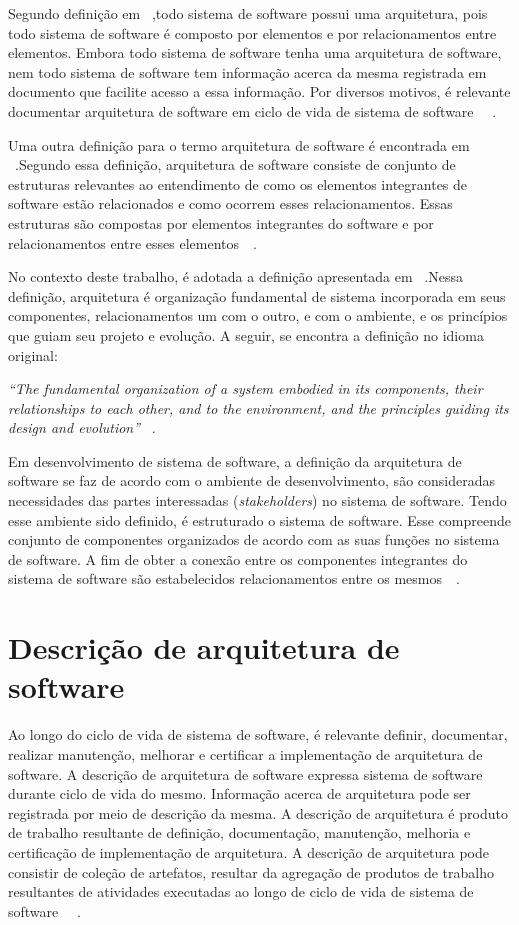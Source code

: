 Segundo definição em ~\cite{arq_01},todo sistema de software possui uma arquitetura, pois todo sistema de software é composto por elementos e por relacionamentos entre elementos. Embora todo sistema de software tenha uma arquitetura de software, nem todo sistema de software tem informação acerca da mesma registrada em documento que facilite acesso a essa informação. Por diversos motivos, é relevante documentar arquitetura de software em ciclo de vida de sistema de software ~\cite{arq_01}~\cite{Carnegie_textbook}.

Uma outra definição para o termo arquitetura de software é encontrada em ~\cite{arq_02}.Segundo essa definição, arquitetura de software consiste de conjunto de estruturas relevantes ao entendimento de como os elementos integrantes de software estão relacionados e como ocorrem esses relacionamentos. Essas estruturas são compostas por elementos integrantes do software e por relacionamentos entre esses elementos~\cite{Carnegie_textbook}~\cite{arq_02}.

No contexto deste trabalho, é adotada a definição apresentada em ~\cite{ISO_1471}.Nessa definição, arquitetura é organização fundamental de sistema incorporada em seus componentes, relacionamentos um com o outro, e com o ambiente, e os princípios que guiam seu projeto e evolução. A seguir, se encontra a definição no idioma original:


\emph{
“The fundamental organization of a system embodied in its components, their relationships to each other, and to the environment, and the principles guiding its design and evolution”
}~\cite{ISO_1471}.


Em desenvolvimento de sistema de software, a definição da  arquitetura de software se faz de acordo com o ambiente de desenvolvimento, são consideradas necessidades das partes interessadas (\emph{stakeholders}) no sistema de software. Tendo esse ambiente sido definido, é estruturado o sistema de software. Esse compreende conjunto de componentes organizados de acordo com as suas funções no sistema de software. A fim de obter a conexão entre os componentes integrantes do sistema de software são estabelecidos relacionamentos entre os mesmos~\cite{Carnegie_textbook}~\cite{ISO_1471}. 


\section{Descrição de arquitetura de software}

Ao longo do ciclo de vida de sistema de software, é relevante definir, documentar, realizar manutenção, melhorar e certificar a implementação de arquitetura de software. A descrição de arquitetura de software expressa sistema de software durante ciclo de vida do mesmo.
Informação acerca de arquitetura pode ser registrada por meio de descrição da mesma. A descrição de arquitetura é produto de trabalho resultante de definição, documentação, manutenção, melhoria e certificação de implementação de  arquitetura. A descrição de arquitetura pode consistir de coleção de artefatos, resultar da agregação de produtos de trabalho resultantes de atividades executadas ao longo de ciclo de vida de sistema de software  ~\cite{ISO_1471}~\cite{ISO_42010}. 

